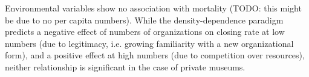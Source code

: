 \documentclass[11pt]{article}
\begin{document}
Environmental variables show no association with mortality (TODO: this might be due to no per capita numbers).
While the density-dependence paradigm predicts a negative effect of numbers of organizations on closing rate at low numbers (due to legitimacy, i.e. growing familiarity with a new organizational form), and a positive effect at high numbers (due to competition over resources), neither relationship is significant in the case of private museums. 




\begin{sloppypar}
\printbibliography
\end{sloppypar}
\end{document}

